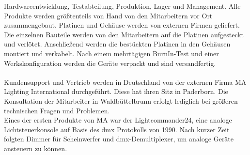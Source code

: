 \documentclass[11pt]{scrartcl}
\begin{document}
Hardwareentwicklung, Testabteilung, Produktion, Lager und Management. Alle Produkte werden
größtenteils von Hand von den Mitarbeitern vor Ort zusammengebaut. Platinen und Gehäuse werden
von externen Firmen geliefert. Die einzelnen Bauteile werden von den Mitarbeitern auf die
Platinen aufgesteckt und verlötet. Anschließend werden die bestückten Platinen in den Gehäusen
montiert und verkabelt. Nach einem mehrtägigen BurnIn-Test und einer Werkskonfiguration werden
die Geräte verpackt und sind versandfertig.\\
\\
Kundensupport und Vertrieb werden in Deutschland von der externen Firma MA Lighting International
durchgeführt. Diese hat ihren Sitz in Paderborn. Die Konsultation der Mitarbeiter in
Waldbüttelbrunn erfolgt lediglich bei größeren technischen Fragen und Problemen.\\
Eines der ersten Produkte von MA war der Lightcommander24, eine analoge Lichtsteuerkonsole auf
Basis des \ac{dmx} Protokolls von 1990. Nach kurzer Zeit folgten Dimmer für
Scheinwerfer und \ac{dmx}-Demultiplexer, um analoge Geräte ansteuern zu können.\\
\end{document}
